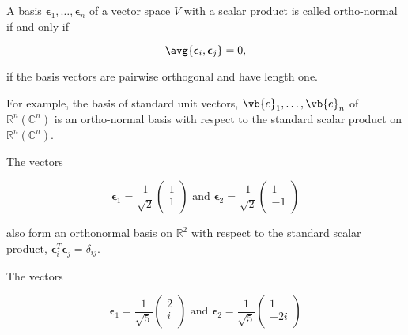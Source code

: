 \documentclass[a4paper,12pt]{report}
\begin{document}
\begin{definition}
A basis \(\boldsymbol{\epsilon  }_{1} , \ldots   , \boldsymbol{\epsilon}_{n}    \) of a vector space \(V\) with a scalar product is called ortho-normal if and only if

\begin{equation}
    \avg{\boldsymbol{\epsilon }_{i} , \boldsymbol{\epsilon } _{j}   } = 0,
\end{equation}

\ie if the basis vectors are pairwise orthogonal and have length one.

\end{definition}

For example, the basis of standard unit vectors, \(\vb{e}_1, \ldots, \vb{e}_n \) of \(\mathbb{R}^{n} (\mathbb{C}^{n} ) \) is an ortho-normal basis with respect to the standard scalar product on \(\mathbb{R}^{n} (\mathbb{C}^{n} ) \).

The vectors 

\begin{equation}
    \boldsymbol{\epsilon } _{1} = \frac{1}{\sqrt{2} } \begin{pmatrix}
         1 \\
         1 \\
    \end{pmatrix} \text { and } \boldsymbol{\epsilon } _{2} = \frac{1}{\sqrt{2} } \begin{pmatrix}
         1 \\
         -1 \\
    \end{pmatrix}    
\end{equation}

also form an orthonormal basis on \(\mathbb{R}^2\) with respect to the standard scalar product, \ie \(\boldsymbol{\epsilon }_{i}^{T}\boldsymbol{\epsilon }_{j} = \delta _{ij}     \). 

The vectors

\begin{equation}
    \boldsymbol{\epsilon }_{1} = \frac{1}{\sqrt{5} } \begin{pmatrix}
         2 \\
         i \\
    \end{pmatrix} \text { and } \boldsymbol{\epsilon }_{2}= \frac{1}{\sqrt{5} } \begin{pmatrix}
         1 \\
         -2i \\
    \end{pmatrix}     
\end{equation}
\end{document}
